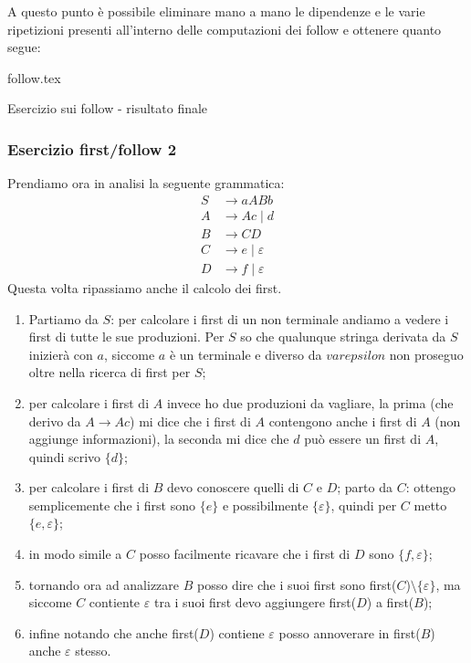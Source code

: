 \documentclass[class=book, crop=false, oneside, 12pt]{standalone}
\begin{document}
A questo punto è possibile eliminare mano a mano le dipendenze e le varie ripetizioni presenti all'interno delle computazioni dei follow e ottenere quanto segue: 

\begin{table}[H]
	\centering
	{follow.tex}
    \caption{Esercizio sui follow - risultato finale}
    \label{follow}
\end{table}

\subsubsection{Esercizio first/follow 2}
\label{first-folllow-ex-2}
Prendiamo ora in analisi la seguente grammatica:
\begin{align*}
       S &\to aABb \\
       A &\to Ac \mid d \\
       B &\to CD \\
       C &\to e \mid \varepsilon \\
       D &\to f \mid \varepsilon
\end{align*}
Questa volta ripassiamo anche il calcolo dei first.
\begin{enumerate}
    \item Partiamo da \(S\): per calcolare i first di un non terminale andiamo a vedere i first di tutte le sue produzioni. Per \(S\) so che qualunque stringa derivata da \(S\) inizierà con \(a\), siccome \(a\) è un terminale e diverso da \(varepsilon\) non proseguo oltre nella ricerca di first per \(S\);
    \item per calcolare i first di \(A\) invece ho due produzioni da vagliare, la prima (che derivo da \(A \to Ac\)) mi dice che i first di \(A\) contengono anche i first di \(A\) (non aggiunge informazioni), la seconda mi dice che \(d\) può essere un first di \(A\), quindi scrivo \(\{d\}\);
    \item per calcolare i first di \(B\) devo conoscere quelli di \(C\) e \(D\); parto da \(C\): ottengo semplicemente che i first sono \(\{e\}\) e possibilmente \(\{\varepsilon\}\), quindi per \(C\) metto \(\{e, \varepsilon\}\);
    \item in modo simile a \(C\) posso facilmente ricavare che i first di \(D\) sono \(\{f, \varepsilon\}\);
    \item tornando ora ad analizzare \(B\) posso dire che i suoi first sono first(\(C\))\( \setminus \{\varepsilon\}\), ma siccome \(C\) contiente \(\varepsilon\) tra i suoi first devo aggiungere first(\(D\)) a first(\(B\));
    \item infine notando che anche first(\(D\)) contiene \(\varepsilon\) posso annoverare in first(\(B\)) anche \(\varepsilon\) stesso.    
\end{enumerate}
\end{document}
